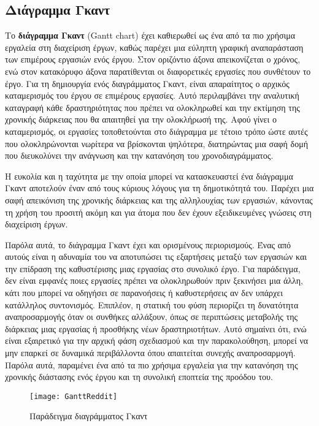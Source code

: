         \subsection{Διάγραμμα Γκαντ}
            Το \textbf{διάγραμμα Γκαντ} (Gantt chart) έχει καθιερωθεί ως ένα από τα πιο χρήσιμα εργαλεία στη διαχείριση έργων, καθώς παρέχει μια εύληπτη γραφική αναπαράσταση των επιμέρους εργασιών ενός έργου. Στον οριζόντιο άξονα απεικονίζεται ο χρόνος, ενώ στον κατακόρυφο άξονα παρατίθενται οι διαφορετικές εργασίες που συνθέτουν το έργο.  Για τη δημιουργία ενός διαγράμματος Γκαντ, είναι απαραίτητος ο αρχικός καταμερισμός του έργου σε επιμέρους εργασίες. Αυτό περιλαμβάνει την αναλυτική καταγραφή κάθε δραστηριότητας που πρέπει να ολοκληρωθεί και την εκτίμηση της χρονικής διάρκειας που θα απαιτηθεί για την ολοκλήρωσή της. Αφού γίνει ο καταμερισμός, οι εργασίες τοποθετούνται στο διάγραμμα με τέτοιο τρόπο ώστε αυτές που ολοκληρώνονται νωρίτερα να βρίσκονται ψηλότερα, διατηρώντας μια σαφή δομή που διευκολύνει την ανάγνωση και την κατανόηση του χρονοδιαγράμματος.

            Η ευκολία και η ταχύτητα με την οποία μπορεί να κατασκευαστεί ένα διάγραμμα Γκαντ αποτελούν έναν από τους κύριους λόγους για τη δημοτικότητά του. Παρέχει μια σαφή απεικόνιση της χρονικής διάρκειας και της αλληλουχίας των εργασιών, κάνοντας τη χρήση του προσιτή ακόμη και για άτομα που δεν έχουν εξειδικευμένες γνώσεις στη διαχείριση έργων.

            Παρόλα αυτά, το διάγραμμα Γκαντ έχει και ορισμένους περιορισμούς. Ένας από αυτούς είναι η αδυναμία του να αποτυπώσει τις εξαρτήσεις μεταξύ των εργασιών και την επίδραση της καθυστέρισης μιας εργασίας στο συνολικό έργο. Για παράδειγμα, δεν είναι εμφανές ποιες εργασίες πρέπει να ολοκληρωθούν πριν ξεκινήσει μια άλλη, κάτι που μπορεί να οδηγήσει σε παρανοήσεις ή καθυστερήσεις αν δεν υπάρχει κατάλληλος συντονισμός. Επιπλέον, η στατική του φύση περιορίζει τη δυνατότητα αναπροσαρμογής όταν οι συνθήκες αλλάξουν, όπως σε περιπτώσεις μεταβολής της διάρκειας μιας εργασίας ή προσθήκης νέων δραστηριοτήτων. Αυτό σημαίνει ότι, ενώ είναι εξαιρετικό για την αρχική φάση σχεδιασμού και την παρακολούθηση, μπορεί να μην επαρκεί σε δυναμικά περιβάλλοντα όπου απαιτείται συνεχής αναπροσαρμογή. Παρόλα αυτά, παραμένει ένα από τα πιο χρήσιμα εργαλεία για την κατανόηση της χρονικής διάστασης ενός έργου και τη συνολική εποπτεία της προόδου του. \cite{Xenos}

            \begin{figure}[h!] \noindent \centering
                \texttt{[image: GanttReddit]}
                \caption{Παράδειγμα διαγράμματος Γκαντ}
            \end{figure}

